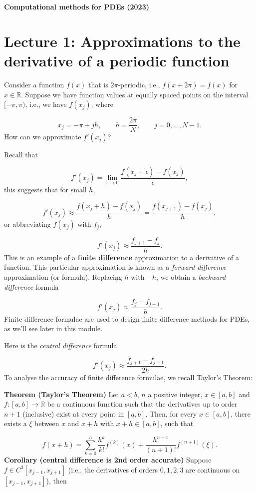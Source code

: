 \documentclass[12pt,a4paper]{article}
\begin{document}
\textbf{Computational methods for PDEs (2023)}

\section{Lecture 1: Approximations to the derivative of a periodic function}
Consider a function $f(x)$ that is $2\pi$-periodic, i.e., $f(x+2\pi) = f(x)$ for $x \in \mathbb{R}$.  Suppose we have function values at equally spaced points on the interval $[-\pi, \pi)$, i.e., we have $f(x_j)$, where

\[
x_j = -\pi + jh, \qquad h = \frac{2\pi}{N}, \qquad j = 0, \ldots, N-1.
\]
How can we approximate $f'(x_j)$?

Recall that

\[
f'(x_j) = \lim_{\epsilon \to 0} \frac{f(x_j +\epsilon) - f(x_j)}{\epsilon},
\]
this suggests that for small $h$,

\[
f'(x_j) \approx \frac{f(x_j+h)-f(x_j)}{h} = \frac{f(x_{j+1})-f(x_j)}{h},  
\]
or abbreviating $f(x_j)$ with $f_j$,

\[
f'(x_j) \approx \frac{f_{j+1}-f_j}{h}.
\]
This is an example of a \textbf{finite difference} approximation to a derivative of a function.  This particular approximation is known as a \emph{forward difference} approximation (or formula).  Replacing $h$ with $-h$, we obtain a \emph{backward difference} formula

\[
f'(x_j) \approx \frac{f_{j}-f_{j-1}}{h}.
\]
Finite difference formulae are used to design finite difference methods for PDEs, as we'll see later in this module.

Here is the \emph{central difference} formula

\[
f'(x_j) \approx \frac{f_{j+1}-f_{j-1}}{2h}.
\]
To analyse the accuracy of finite difference formulae, we recall Taylor's Theorem:

\textbf{Theorem (Taylor's Theorem)}  Let $a<b$, $n$ a positive integer, $x\in[a,b]$ and $f: [a,b]\to\mathbb{R}$ be a continuous function such that the derivatives up to order $n+1$ (inclusive) exist at every point in $[a,b]$. Then, for every $x\in[a,b]$, there exists a $\xi$ between $x$ and $x+h$ with $x+h\in[a,b]$, such that

\[
f(x+h)=\sum_{k=0}^{n}\frac{h^k}{k!}f^{(k)}(x)+\frac{h^{n+1}}{(n+1)!}f^{(n+1)}(\xi).
\]
\textbf{Corollary (central difference is 2nd order accurate)} Suppose $f \in C^3[x_{j-1},x_{j+1}]$ (i.e., the derivatives of orders $0, 1, 2, 3$ are continuous on $[x_{j-1},x_{j+1}]$), then 
\end{document}
